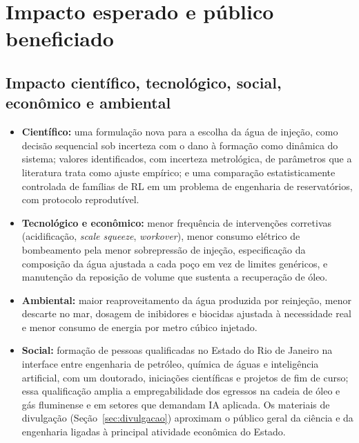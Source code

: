 \documentclass[10pt,a4paper]{article}
\newcommand{\itemedital}[1]{}
\begin{document}
\section{Impacto esperado e público beneficiado}\itemedital{2.16 XXI; Anexo 1 E}

\subsection{Impacto científico, tecnológico, social, econômico e ambiental}\itemedital{2.16 XXI}
\begin{itemize}
  \item \textbf{Científico:} uma formulação nova para a escolha da água de injeção, como decisão
        sequencial sob incerteza com o dano à formação como dinâmica do sistema; valores
        identificados, com incerteza metrológica, de parâmetros que a literatura trata como
        ajuste empírico; e uma comparação estatisticamente controlada de famílias de RL em um
        problema de engenharia de reservatórios, com protocolo reprodutível.
  \item \textbf{Tecnológico e econômico:} menor frequência de intervenções corretivas
        (acidificação, \textit{scale squeeze}, \textit{workover}), menor consumo elétrico de
        bombeamento pela menor sobrepressão de injeção, especificação da composição da água
        ajustada a cada poço em vez de limites genéricos, e manutenção da reposição de volume que sustenta
        a recuperação de óleo.
  \item \textbf{Ambiental:} maior reaproveitamento da água produzida por reinjeção, menor
        descarte no mar, dosagem de inibidores e biocidas ajustada à necessidade real e menor
        consumo de energia por metro cúbico injetado.
  \item \textbf{Social:} formação de pessoas qualificadas no Estado do Rio de Janeiro na
        interface entre engenharia de petróleo, química de águas e inteligência artificial,
        com um doutorado, iniciações científicas e projetos de fim de curso; essa qualificação amplia a
        empregabilidade dos egressos na cadeia de óleo e gás fluminense e em setores que
        demandam IA aplicada. Os materiais de divulgação (Seção~\ref{sec:divulgacao})
        aproximam o público geral da ciência e da engenharia ligadas à principal atividade
        econômica do Estado.
\end{itemize}
\end{document}
